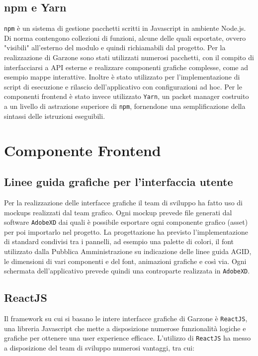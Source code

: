 \subsection{npm e Yarn}
\lstinline[basicstyle=\ttfamily]!npm! è un sistema di gestione pacchetti scritti in Javascript in ambiente Node.js. Di norma contengono collezioni di funzioni, alcune delle quali esportate, ovvero "visibili" all'esterno del modulo e quindi richiamabili dal progetto. Per la realizzazione di Garzone sono stati utilizzati numerosi pacchetti, con il compito di interfacciarsi a API esterne e realizzare componenti grafiche complesse, come ad esempio mappe interattive. Inoltre è stato utilizzato per l'implementazione di script di esecuzione e rilascio dell'applicativo con configurazioni ad hoc. Per le componenti frontend è stato invece utilizzato \lstinline[basicstyle=\ttfamily]!Yarn!, un packet manager costruito a un livello di astrazione superiore di \lstinline[basicstyle=\ttfamily]!npm!, fornendone una semplificazione della sintassi delle istruzioni eseguibili.
\newpage
\section{Componente Frontend}
\subsection{Linee guida grafiche per l'interfaccia utente}
Per la realizzazione delle interfacce grafiche il team di sviluppo ha fatto uso di mockups realizzati dal team grafico. Ogni mockup prevede file generati dal software \lstinline[basicstyle=\ttfamily]!AdobeXD! dai quali è possibile esportare ogni componente grafico (asset) per poi importarlo nel progetto. La progettazione ha previsto l'implementazione di standard condivisi tra i pannelli, ad esempio una palette di colori, il font utilizzato dalla Pubblica Amministrazione su indicazione delle linee guida AGID, le dimensioni di vari componenti e del font, animazioni grafiche e così via. Ogni schermata dell'applicativo prevede quindi una controparte realizzata in \lstinline[basicstyle=\ttfamily]!AdobeXD!.
\subsection{ReactJS}
Il framework su cui si basano le intere interfacce grafiche di Garzone è \lstinline[basicstyle=\ttfamily]!ReactJS!, una libreria Javascript che mette a disposizione numerose funzionalità logiche e grafiche per ottenere una user experience efficace. L'utilizzo di \lstinline[basicstyle=\ttfamily]!ReactJS! ha messo a disposizione del team di sviluppo numerosi vantaggi, tra cui:
